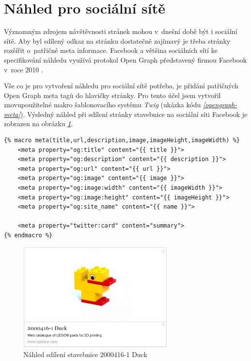 \section{Náhled pro sociální sítě}
Významným zdrojem návštěvnosti stránek mohou v~dnešní době být i sociální sítě. Aby byl sdílený odkaz na stránku dostatečně zajímavý je třeba stránky rozšířit o~patřičné meta informace. Facebook a většina sociálních sítí ke specifikování náhledu využívá protokol Open Graph představený firmou Facebook v~roce 2010 \autocite{opengraph}.

Vše co je pro vytvoření náhledu pro sociální sítě potřeba, je přidání patřičných Open Graph meta tagů do hlavičky stránky. Pro tento účel jsem vytvořil znovupoužitelné makro šablonovacího systému \textit{Twig} (ukázka kódu \emph{\ref{opengraph-meta}}). Výsledný náhled při sdílení stránky stavebnice na sociální síti Facebook je zobrazen na obrázku \emph{\ref{facebook-share}}. 

\begin{listing}[htbp]
  \begin{verbatim}
{% macro meta(title,url,description,image,imageHeight,imageWidth) %}
    <meta property="og:title" content="{{ title }}">
    <meta property="og:description" content="{{ description }}">
    <meta property="og:url" content="{{ url }}">
    <meta property="og:image" content="{{ image }}">
    <meta property="og:image:width" content="{{ imageWidth }}">
    <meta property="og:image:height" content="{{ imageHeight }}">
    <meta property="og:site_name" content="{{ name }}">

    <meta property="twitter:card" content="summary">
{% endmacro %}
  \end{verbatim}
  \caption{\textit{Twig} makro pro přidání Open Graph meta tagů\label{opengraph-meta}}
\end{listing}

\begin{figure}[htbp]
      \centering
      \includegraphics[width=0.7\textwidth,height=\textheight,keepaspectratio]{images/fbshare.png}
      \caption{Náhled sdílení stavebnice 2000416-1 Duck\label{facebook-share}}
\end{figure}